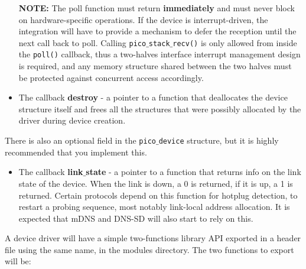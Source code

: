 \begin{itemize}
\textbf{NOTE:} The poll function must return \textbf{immediately} and must never block on
hardware-specific operations. If the device is interrupt-driven, the integration will have
to provide a mechanism to defer the reception until the next call back to poll. Calling
\texttt{pico$\_$stack$\_$recv()} is only allowed from inside the \texttt{poll()} callback,
thus a two-halves interface interrupt management design is required, and any memory structure
shared between the two halves must be protected against concurrent access accordingly.

\item The callback \textbf{destroy} - a pointer to a function that deallocates the device
structure itself and frees all the structures that were possibly allocated by the driver 
during device creation.
\end{itemize}

There is also an optional field in the \texttt{pico$\_$device} structure, but it is
highly recommended that you implement this.

\begin{itemize}
\item The callback \textbf{link$\_$state} - a pointer to a function that returns info on
the link state of the device. When the link is down, a 0 is returned, if it is
up, a 1 is returned. Certain protocols depend on this function for hotplug
detection, to restart a probing sequence, most notably link-local address
allocation. It is expected that mDNS and DNS-SD will also start to rely on
this.  
\end{itemize}

A device driver will have a simple two-functions library API exported in a header file using
the same name, in the modules directory. The two functions to export will be:

